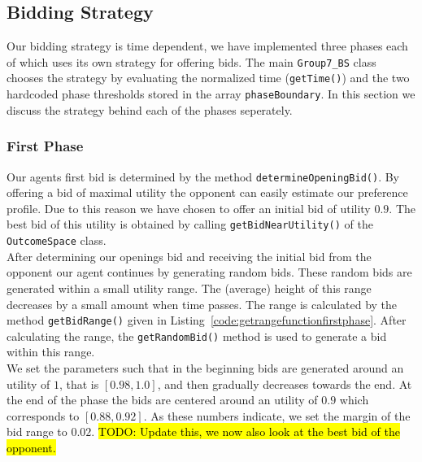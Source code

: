 \documentclass[a4paper,10pt]{article}
\newcommand{\todo}[1] {\hl{TODO: #1}}
\begin{document}
\subsection{Bidding Strategy}
\label{sec:strategyBS}
Our bidding strategy is time dependent, we have implemented three phases each of which uses its own strategy for offering bids. The main \texttt{Group7\_BS} class chooses the strategy by evaluating the normalized time (\texttt{getTime()}) and the two hardcoded phase thresholds stored in the array \texttt{phaseBoundary}. In this section we discuss the strategy behind each of the phases seperately.

\subsubsection{First Phase}
Our agents first bid is determined by the method \texttt{determineOpeningBid()}. By offering a bid of maximal utility the opponent can easily estimate our preference profile. Due to this reason we have chosen to offer an initial bid of utility $0.9$. The best bid of this utility is obtained by calling \texttt{getBidNearUtility()} of the \texttt{OutcomeSpace} class. \\

After determining our openings bid and receiving the initial bid from the opponent our agent continues by generating random bids. These random bids are generated within a small utility range. The (average) height of this range decreases by a small amount when time passes. The range is calculated by the method \texttt{getBidRange()} given in Listing~\ref{code:getrangefunctionfirstphase}. After calculating the range, the \texttt{getRandomBid()} method is used to generate a bid within this range. \\

We set the parameters such that in the beginning bids are generated around an utility of $1$, that is $[0.98, 1.0]$, and then gradually decreases towards the end. At the end of the phase the bids are centered around an utility of $0.9$ which corresponds to $[0.88, 0.92]$. As these numbers indicate, we set the margin of the bid range to $0.02$. \todo{Update this, we now also look at the best bid of the opponent.}

\clearpage
\end{document}
